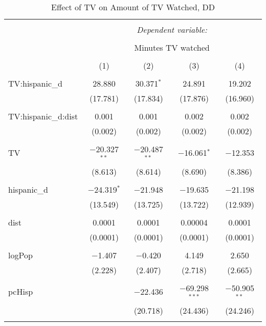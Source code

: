 
\begin{table}[!htbp] \centering 
  \caption{Effect of TV on Amount of TV Watched, DD} 
  \label{} 
\begin{tabular}{@{\extracolsep{-5pt}}lcccc} 
\\[-1.8ex]\hline 
\hline \\[-1.8ex] 
 & \multicolumn{4}{c}{\textit{Dependent variable:}} \\ 
\cline{2-5} 
\\[-1.8ex] & \multicolumn{4}{c}{Minutes TV watched} \\ 
\\[-1.8ex] & (1) & (2) & (3) & (4)\\ 
\hline \\[-1.8ex] 
 TV:hispanic\_d & 28.880 & 30.371$^{*}$ & 24.891 & 19.202 \\ 
  & (17.781) & (17.834) & (17.876) & (16.960) \\ 
  & & & & \\ 
 TV:hispanic\_d:dist & 0.001 & 0.001 & 0.002 & 0.002 \\ 
  & (0.002) & (0.002) & (0.002) & (0.002) \\ 
  & & & & \\ 
 TV & $-$20.327$^{**}$ & $-$20.487$^{**}$ & $-$16.061$^{*}$ & $-$12.353 \\ 
  & (8.613) & (8.614) & (8.690) & (8.386) \\ 
  & & & & \\ 
 hispanic\_d & $-$24.319$^{*}$ & $-$21.948 & $-$19.635 & $-$21.198 \\ 
  & (13.549) & (13.725) & (13.722) & (12.939) \\ 
  & & & & \\ 
 dist & 0.0001 & 0.0001 & 0.00004 & 0.0001 \\ 
  & (0.0001) & (0.0001) & (0.0001) & (0.0001) \\ 
  & & & & \\ 
 logPop & $-$1.407 & $-$0.420 & 4.149 & 2.650 \\ 
  & (2.228) & (2.407) & (2.718) & (2.665) \\ 
  & & & & \\ 
 pcHisp &  & $-$22.436 & $-$69.298$^{***}$ & $-$50.905$^{**}$ \\ 
  &  & (20.718) & (24.436) & (24.246) \\ 
  & & & & \\ 

\end{tabular}
\end{table}
